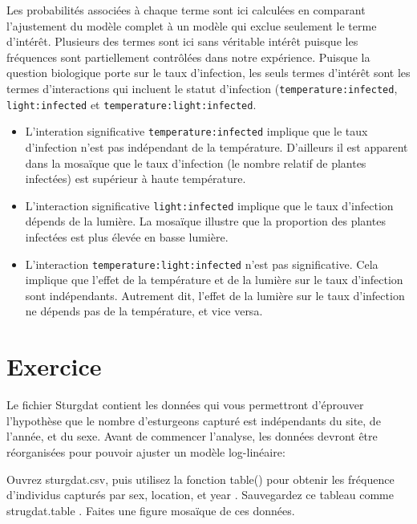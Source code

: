 \documentclass[12pt,]{book}
\makeatletter
\providecommand{\tightlist}{%
  \setlength{\itemsep}{0pt}\setlength{\parskip}{0pt}}
\newenvironment{kframe}{%
\medskip{}
\setlength{\fboxsep}{.8em}
\def\at@end@of@kframe{}%
\ifinner\ifhmode%
 \def\at@end@of@kframe{\end{minipage}}%
 \begin{minipage}{\columnwidth}%
\fi\fi%
\def\FrameCommand##1{\hskip\@totalleftmargin \hskip-\fboxsep
\colorbox{incolor}{##1}\hskip-\fboxsep
    \hskip-\linewidth \hskip-\@totalleftmargin \hskip\columnwidth}%
\MakeFramed {\advance\hsize-\width
  \@totalleftmargin\z@ \linewidth\hsize
  \@setminipage}}%
{\par\unskip\endMakeFramed%
\at@end@of@kframe}
\newenvironment{rmdblock}[1]
 {
 \begin{itemize}
 \renewcommand{\labelitemi}{
   \raisebox{-.7\height}[0pt][0pt]{
     {\setkeys{Gin}{width=3em,keepaspectratio}\texttt{[image: images/\#1]}}
   }
 }
 \begin{kframe}
 \setlength{\fboxsep}{1em}
 \item
 }
 {
 \end{kframe}
 \end{itemize}
 }
\newenvironment{rmdcode}
  {\begin{rmdblock}{screen}}
  {\end{rmdblock}}
\makeatother
\begin{document}
Les probabilités associées à chaque terme sont ici calculées en comparant l'ajustement du modèle complet à un modèle qui exclue seulement le terme d'intérêt. Plusieurs des termes sont ici sans véritable intérêt puisque les fréquences sont partiellement contrôlées dans notre expérience. Puisque la question biologique porte sur le taux d'infection, les seuls termes d'intérêt sont les termes d'interactions qui incluent le statut d'infection (\texttt{temperature:infected}, \texttt{light:infected} et \texttt{temperature:light:infected}.

\begin{itemize}
\tightlist
\item
  L'interation significative \texttt{temperature:infected} implique que le taux d'infection n'est pas indépendant de la température. D'ailleurs il est apparent dans la mosaïque que le taux d'infection (le nombre relatif de plantes infectées) est supérieur à haute température.
\item
  L'interaction significative \texttt{light:infected} implique que le taux d'infection dépends de la lumière. La mosaïque illustre que la proportion des plantes infectées est plus élevée en basse lumière.
\item
  L'interaction \texttt{temperature:light:infected} n'est pas significative. Cela implique que l'effet de la température et de la lumière sur le taux d'infection sont indépendants. Autrement dit, l'effet de la lumière sur le taux d'infection ne dépends pas de la température, et vice versa.
\end{itemize}

\hypertarget{ex-glm}{%
\section{Exercice}\label{ex-glm}}

Le fichier Sturgdat contient les données qui vous permettront d'éprouver l'hypothèse que le nombre d'esturgeons capturé est indépendants du site, de l'année, et du sexe. Avant de commencer l'analyse, les données devront être réorganisées pour pouvoir ajuster un modèle log-linéaire:

\begin{rmdcode}
Ouvrez sturgdat.csv, puis utilisez la fonction table() pour obtenir les fréquence d'individus capturés par sex, location, et year . Sauvegardez ce tableau comme strugdat.table . Faites une figure mosaïque de ces données.
\end{rmdcode}
\end{document}
